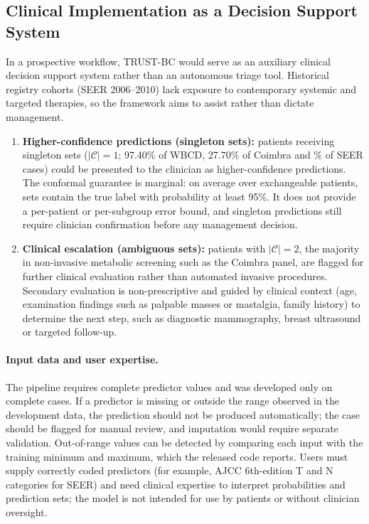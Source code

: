 \documentclass[11pt,a4paper]{article}
\begin{document}
\subsection{Clinical Implementation as a Decision Support System}\label{sec:clinical-implementation-as-a-d}
In a prospective workflow, TRUST-BC would serve as an auxiliary clinical decision support system rather than an autonomous triage tool. Historical registry cohorts (SEER 2006--2010) lack exposure to contemporary systemic and targeted therapies, so the framework aims to assist rather than dictate management.
\begin{enumerate}
\item \textbf{Higher-confidence predictions (singleton sets):} patients receiving singleton sets ($|\mathcal{C}|=1$; 97.40\% of WBCD, 27.70\% of Coimbra and \seerConfSingle\% of SEER cases) could be presented to the clinician as higher-confidence predictions. The conformal guarantee is marginal: on average over exchangeable patients, sets contain the true label with probability at least 95\%. It does not provide a per-patient or per-subgroup error bound, and singleton predictions still require clinician confirmation before any management decision.
\item \textbf{Clinical escalation (ambiguous sets):} patients with $|\mathcal{C}|=2$, the majority in non-invasive metabolic screening such as the Coimbra panel, are flagged for further clinical evaluation rather than automated invasive procedures. Secondary evaluation is non-prescriptive and guided by clinical context (age, examination findings such as palpable masses or mastalgia, family history) to determine the next step, such as diagnostic mammography, breast ultrasound or targeted follow-up.
\end{enumerate}
\paragraph{Input data and user expertise.} The pipeline requires complete predictor values and was developed only on complete cases. If a predictor is missing or outside the range observed in the development data, the prediction should not be produced automatically; the case should be flagged for manual review, and imputation would require separate validation. Out-of-range values can be detected by comparing each input with the training minimum and maximum, which the released code reports. Users must supply correctly coded predictors (for example, AJCC 6th-edition T and N categories for SEER) and need clinical expertise to interpret probabilities and prediction sets; the model is not intended for use by patients or without clinician oversight.
\end{document}
